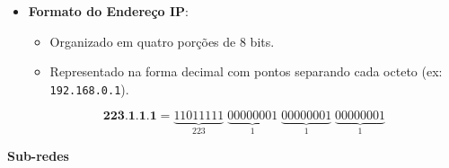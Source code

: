 \begin{itemize}[left=0.5cm, align=left, nosep]
                \item \textbf{Formato do Endereço IP}:  
                \begin{itemize}[left=0.5cm, nosep, label=$\hookrightarrow$]
                    \item Organizado em quatro porções de 8 bits.
                    \item Representado na forma decimal com pontos separando cada octeto (ex: \texttt{192.168.0.1}).
                \end{itemize}

                \[
                    \textbf{223.1.1.1}
                    =
                    \underbrace{11011111}_{223} \;
                    \underbrace{00000001}_{1} \;
                    \underbrace{00000001}_{1} \;
                    \underbrace{00000001}_{1}
                \]
            
            \end{itemize}

            \textbf{Sub-redes}

